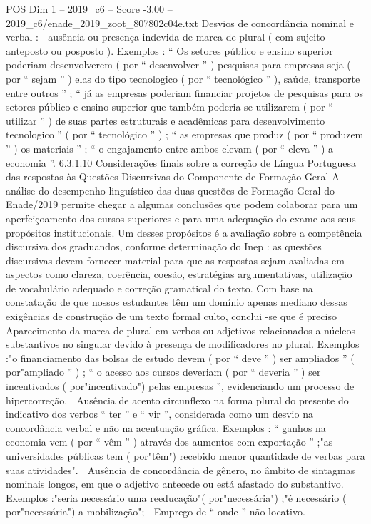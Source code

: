 \begin{textsample}{POS Dim 1 – 2019\_c6 – Score -3.00 – 2019\_c6/enade\_2019\_zoot\_807802c04e.txt}
Desvios de concordância nominal e verbal :  ausência ou presença indevida de marca de plural ( com sujeito anteposto ou posposto ).
Exemplos : “ Os setores público e ensino superior poderiam desenvolverem ( por “ desenvolver ” ) pesquisas para empresas seja ( por “ sejam ” ) elas do tipo tecnologico ( por “ tecnológico ” ), saúde, transporte entre outros ” ; “ já as empresas poderiam financiar projetos de pesquisas para os setores público e ensino superior que também poderia se utilizarem ( por “ utilizar ” ) de suas partes estruturais e acadêmicas para desenvolvimento tecnologico ” ( por “ tecnológico ” ) ; “ as empresas que produz ( por “ produzem ” ) os materiais ” ; “ o engajamento entre ambos elevam ( por “ eleva ” ) a economia ”. 6.3.1.10 Considerações finais sobre a correção de Língua Portuguesa das respostas às Questões Discursivas do Componente de Formação Geral A análise do desempenho linguístico das duas questões de Formação Geral do Enade/2019 permite chegar a algumas conclusões que podem colaborar para um aperfeiçoamento dos cursos superiores e para uma adequação do exame aos seus propósitos institucionais.
Um desses propósitos é a avaliação sobre a competência discursiva dos graduandos, conforme determinação do Inep : as questões discursivas devem fornecer material para que as respostas sejam avaliadas em aspectos como clareza, coerência, coesão, estratégias argumentativas, utilização de vocabulário adequado e correção gramatical do texto.
Com base na constatação de que nossos estudantes têm um domínio apenas mediano dessas exigências de construção de um texto formal culto, conclui -se que é preciso  Aparecimento da marca de plural em verbos ou adjetivos relacionados a núcleos substantivos no singular devido à presença de modificadores no plural.
Exemplos :"o financiamento das bolsas de estudo devem ( por “ deve ” ) ser ampliados ” ( por"ampliado ” ) ; “ o acesso aos cursos deveriam ( por “ deveria ” ) ser incentivados ( por"incentivado") pelas empresas ”, evidenciando um processo de hipercorreção.  Ausência de acento circunflexo na forma plural do presente do indicativo dos verbos “ ter ” e “ vir ”, considerada como um desvio na concordância verbal e não na acentuação gráfica.
Exemplos : “ ganhos na economia vem ( por “ vêm ” ) através dos aumentos com exportação ” ;"as universidades públicas tem ( por"têm") recebido menor quantidade de verbas para suas atividades".  Ausência de concordância de gênero, no âmbito de sintagmas nominais longos, em que o adjetivo antecede ou está afastado do substantivo.
Exemplos :"seria necessário uma reeducação"( por"necessária") ;"é necessário ( por"necessária") a mobilização";  Emprego de “ onde ” não locativo.

\end{textsample}
